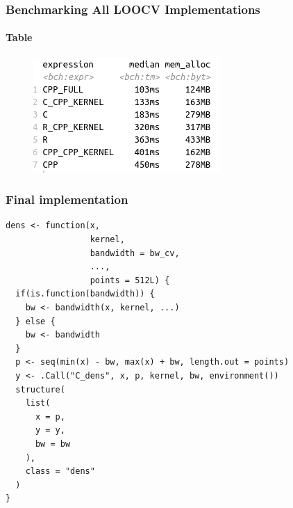 \documentclass[aspectratio=169]{beamer}
\begin{document}
\begin{frame}
  \frametitle{Benchmarking All LOOCV Implementations}
  \framesubtitle{Table}
  \begin{figure}
    \centering
    \includegraphics[scale = 0.7]{figure/CvsRCPPvsR_cv.png}
  \end{figure}
\end{frame}
\begin{frame}[fragile]
  \frametitle{Final implementation}
\begin{verbatim}
dens <- function(x,
                 kernel,
                 bandwidth = bw_cv,
                 ...,
                 points = 512L) {
  if(is.function(bandwidth)) {
    bw <- bandwidth(x, kernel, ...)
  } else {
    bw <- bandwidth
  }
  p <- seq(min(x) - bw, max(x) + bw, length.out = points)
  y <- .Call("C_dens", x, p, kernel, bw, environment())
  structure(
    list(
      x = p,
      y = y,
      bw = bw
    ),
    class = "dens"
  )
}
\end{verbatim}
\end{frame}
\end{document}
